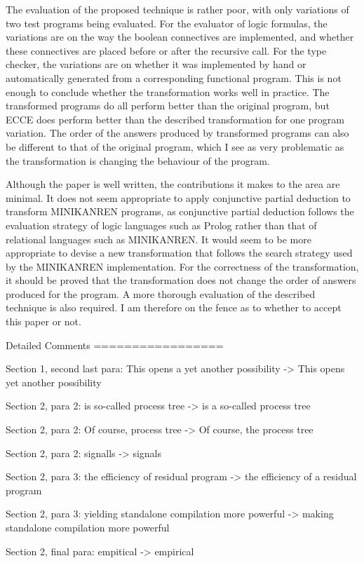 The evaluation of the proposed technique is rather poor, with only variations of two test programs
being evaluated. For the evaluator of logic formulas, the variations are on the way the boolean
connectives are implemented, and whether these connectives are placed before or after the recursive call.
For the type checker, the variations are on whether it was implemented by hand or automatically generated
from a corresponding functional program. This is not enough to conclude whether the transformation
works well in practice. The transformed programs do all perform better than the original program,
but ECCE does perform better than the described transformation for one program variation. The order
of the answers produced by transformed programs can also be different to that of the original program,
which I see as very problematic as the transformation is changing the behaviour of the program.

Although the paper is well written, the contributions it makes to the area are minimal.
It does not seem appropriate to apply conjunctive partial deduction to transform MINIKANREN
programs, as conjunctive partial deduction follows the evaluation strategy of logic languages
such as Prolog rather than that of relational languages such as MINIKANREN. It would seem to
be more appropriate to devise a new transformation that follows the search strategy used by
the MINIKANREN implementation. For the correctness of the transformation, it should be proved
that the transformation does not change the order of answers produced for the program. A more
thorough evaluation of the described technique is also required. I am therefore on the fence
as to whether to accept this paper or not.

Detailed Comments
=================

Section 1, second last para: This opens a yet another possibility -> This opens yet another possibility

Section 2, para 2: is so-called process tree -> is a so-called process tree

Section 2, para 2: Of course, process tree -> Of course, the process tree

Section 2, para 2: signalls -> signals

Section 2, para 3: the efficiency of residual program -> the efficiency of a residual program

Section 2, para 3: yielding standalone compilation more powerful -> making standalone compilation more powerful

Section 2, final para: empitical -> empirical

